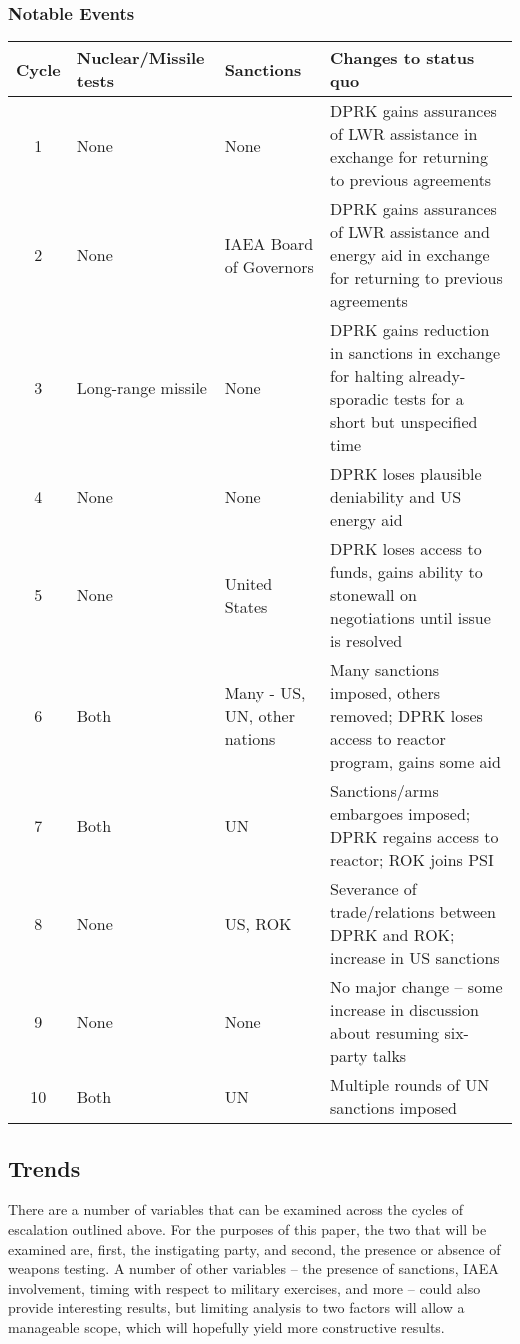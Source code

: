 \documentclass{article}
\begin{document}
\subsubsection{Notable Events} 
\begin{tabular}{|c|p{2.4cm}|p{1.6cm}|p{8cm}|}
	\hline
	Cycle & Nuclear/Missile tests & Sanctions & Changes to status quo \\ 
	\hline
	1 & None & None & DPRK gains assurances of LWR assistance in exchange for returning to previous agreements \\ 
	\hline
	2 & None & IAEA Board of Governors & DPRK gains assurances of LWR assistance and energy aid in exchange for returning to previous agreements \\ 
	\hline
	3 & Long-range missile & None & DPRK gains reduction in sanctions in exchange for halting already-sporadic tests for a short but unspecified time \\ 
	\hline
	4 & None & None & DPRK loses plausible deniability and US energy aid \\ 
	\hline
	5 & None & United States & DPRK loses access to funds, gains ability to stonewall on negotiations until issue is resolved \\ 
	\hline
	6 & Both & Many - US, UN, other nations & Many sanctions imposed, others removed; DPRK loses access to reactor program, gains some aid \\ 
	\hline
	7 & Both & UN & Sanctions/arms embargoes imposed; DPRK regains access to reactor; ROK joins PSI \\ 
	\hline
	8 & None & US, ROK & Severance of trade/relations between DPRK and ROK; increase in US sanctions \\ 
	\hline
	9 & None & None & No major change – some increase in discussion about resuming six-party talks \\ 
	\hline
	10 & Both & UN & Multiple rounds of UN sanctions imposed \\
	\hline
\end{tabular} 

\subsection{Trends}

There are a number of variables that can be examined across the cycles of escalation outlined above. For the purposes of this paper, the two that will be examined are, first, the instigating party, and second, the presence or absence of weapons testing. A number of other variables – the presence of sanctions, IAEA involvement, timing with respect to military exercises, and more – could also provide interesting results, but limiting analysis to two factors will allow a manageable scope, which will hopefully yield more constructive results.
\end{document}
